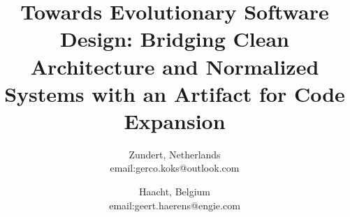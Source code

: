 \title{\bfseries\Large Towards Evolutionary Software Design: Bridging Clean Architecture and Normalized Systems with an Artifact for Code Expansion}

\author{
Zundert, Netherlands \\
email:gerco.koks@outlook.com
\and
{}
Haacht, Belgium \\
email:geert.haerens@engie.com}

\maketitle
